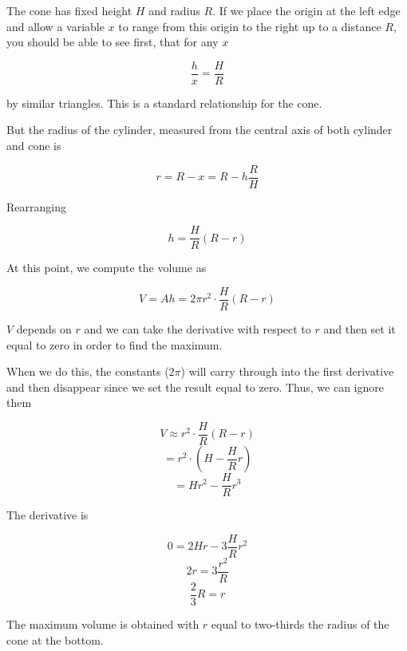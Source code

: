 \documentclass[11pt, oneside]{article}
\begin{document}
The cone has fixed height $H$ and radius $R$.  If we place the origin at the left edge and allow a variable $x$ to range from this origin to the right up to a distance $R$, you should be able to see first, that for any $x$
 
\[ \frac{h}{x} = \frac{H}{R} \]

by similar triangles.  This is a standard relationship for the cone.

But the radius of the cylinder, measured from the central axis of both cylinder and cone is

\[ r = R - x = R - h \frac{R}{H} \]

Rearranging

\[ h = \frac{H}{R} (R - r) \]

At this point, we compute the volume as

\[ V = Ah = 2 \pi r^2 \cdot \frac{H}{R} (R - r) \]

$V$ depends on $r$ and we can take the derivative with respect to $r$ and then set it equal to zero in order to find the maximum.  

When we do this, the constants ($2 \pi$) will carry through into the first derivative and then disappear since we set the result equal to zero.  Thus, we can ignore them

\[ V \approx r^2 \cdot \frac{H}{R} (R - r) \]
\[ = r^2 \cdot (H - \frac{H}{R} r) \]
\[ = Hr^2 - \frac{H}{R} r^3 \]

The derivative is

\[ 0 = 2Hr - 3 \frac{H}{R} r^2 \]
\[ 2r = 3 \frac{r^2}{R} \]
\[ \frac{2}{3} R = r \]

The maximum volume is obtained with $r$ equal to two-thirds the radius of the cone at the bottom.
\end{document}

